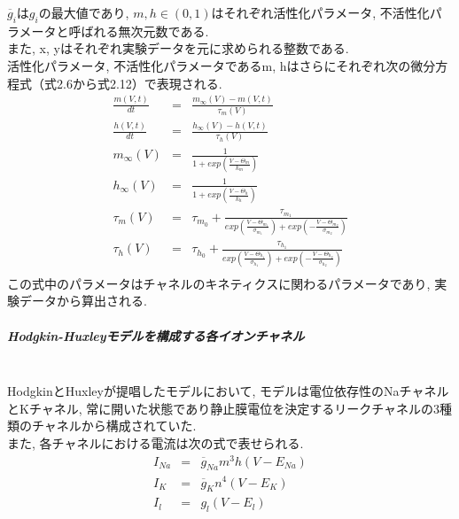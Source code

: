 \clearpage
$\overline{g}_i$は$g_i$の最大値であり, $m, h \in (0, 1)$はそれぞれ活性化パラメータ, 不活性化パラメータと呼ばれる無次元数である.\\
また, x, yはそれぞれ実験データを元に求められる整数である.\\
活性化パラメータ, 不活性化パラメータであるm, hはさらにそれぞれ次の微分方程式（式2.6から式2.12）で表現される.\\
\begin{eqnarray}
  \frac{m(V,t)}{dt} & = &\frac{m_\infty(V) - m(V, t)}{\tau_m(V)}\\
  \frac{h(V,t)}{dt} & = &\frac{h_\infty(V) - h(V, t)}{\tau_h(V)}\\
  m_\infty(V) & = & \frac{1}{1 + exp(\frac{V - \Theta_m}{k_m})}\\
  h_\infty(V) & = & \frac{1}{1 + exp(\frac{V - \Theta_h}{k_h})}\\
  \tau_m(V) & = & \tau_{m_0} + \frac{\tau_{m_1}}{exp(\frac{V - \Theta_{m_1}}{\sigma_{m_1}}) + exp(-\frac{V - \Theta_{m_2}}{\sigma_{m_2}})}\\
  \tau_h(V) & = & \tau_{h_0} + \frac{\tau_{h_1}}{exp(\frac{V - \Theta_{h_1}}{\sigma_{h_1}}) + exp(-\frac{V - \Theta_{h_2}}{\sigma_{h_2}})}\\
\end{eqnarray}
この式中のパラメータはチャネルのキネティクスに関わるパラメータであり, 実験データから算出される.\\

\subparagraph{Hodgkin-Huxleyモデルを構成する各イオンチャネル}~\\
HodgkinとHuxleyが提唱したモデルにおいて, モデルは電位依存性のNaチャネルとKチャネル,
常に開いた状態であり静止膜電位を決定するリークチャネルの3種類のチャネルから構成されていた.\\
また, 各チャネルにおける電流は次の式で表せられる.\\
\begin{eqnarray}
  I_{Na} & = & \overline{g}_{Na}m^3h(V - E_{Na})\\
  I_{K} & = & \overline{g}_{K}n^4(V - E_{K})\\
  I_{l} & =& g_l(V - E_l)\\
\end{eqnarray}

